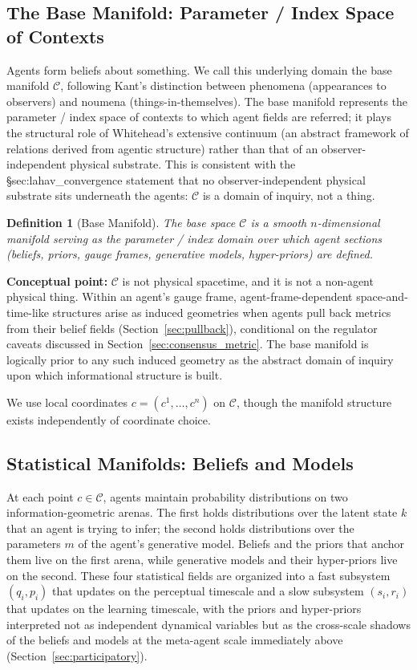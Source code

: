 \documentclass[11pt]{article}
\newtheorem{definition}{Definition}
\begin{document}
\subsection{The Base Manifold: Parameter / Index Space of Contexts}

Agents form beliefs about something. We call this underlying domain the base manifold $\mathcal{C}$, following Kant's distinction between phenomena (appearances to observers) and noumena (things-in-themselves). The base manifold represents the parameter / index space of contexts to which agent fields are referred; it plays the structural role of Whitehead's extensive continuum (an abstract framework of relations derived from agentic structure) rather than that of an observer-independent physical substrate. This is consistent with the §sec:lahav_convergence statement that no observer-independent physical substrate sits underneath the agents: $\mathcal{C}$ is a domain of inquiry, not a thing.

\begin{definition}[Base Manifold]
The base space $\mathcal{C}$ is a smooth $n$-dimensional manifold serving as the parameter / index domain over which agent sections (beliefs, priors, gauge frames, generative models, hyper-priors) are defined.
\end{definition}

\textbf{Conceptual point:} $\mathcal{C}$ is not physical spacetime, and it is not a non-agent physical thing. Within an agent's gauge frame, agent-frame-dependent space-and-time-like structures arise as induced geometries when agents pull back metrics from their belief fields (Section~\ref{sec:pullback}), conditional on the regulator caveats discussed in Section~\ref{sec:consensus_metric}. The base manifold is logically prior to any such induced geometry as the abstract domain of inquiry upon which informational structure is built.

We use local coordinates $c = (c^1, \ldots, c^n)$ on $\mathcal{C}$, though the manifold structure exists independently of coordinate choice.

\subsection{Statistical Manifolds: Beliefs and Models}
\label{sec:statistical_manifolds}

At each point $c \in \mathcal{C}$, agents maintain probability distributions on two information-geometric arenas. The first holds distributions over the latent state $k$ that an agent is trying to infer; the second holds distributions over the parameters $m$ of the agent's generative model. Beliefs and the priors that anchor them live on the first arena, while generative models and their hyper-priors live on the second. These four statistical fields are organized into a fast subsystem $(q_i, p_i)$ that updates on the perceptual timescale and a slow subsystem $(s_i, r_i)$ that updates on the learning timescale, with the priors and hyper-priors interpreted not as independent dynamical variables but as the cross-scale shadows of the beliefs and models at the meta-agent scale immediately above (Section~\ref{sec:participatory}).
\end{document}
